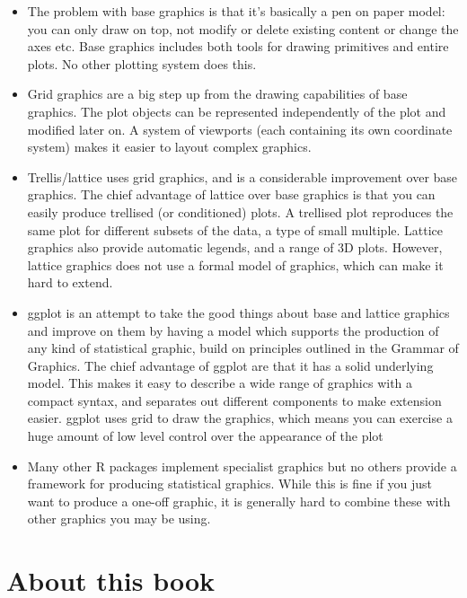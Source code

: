 \begin{itemize} 
	\item The problem with base graphics is that it's basically a pen on paper model: you can only draw on top, not modify or delete existing content or change the axes etc.  Base graphics includes both tools for drawing primitives and entire plots. No other plotting system does this.

	\item Grid graphics are a big step up from the drawing capabilities of base graphics. The plot objects can be represented independently of the plot and modified later on. A system of viewports (each containing its own coordinate system) makes it easier to layout complex graphics.

	\item Trellis/lattice uses grid graphics, and is a considerable improvement over base graphics.  The chief advantage of lattice over base graphics is that you can easily produce trellised (or conditioned) plots.  A trellised plot reproduces the same plot for different subsets of the data, a type of small multiple.  Lattice graphics also provide automatic legends, and a range of 3D plots.  However, lattice graphics does not use a formal model of graphics, which can make it hard to extend.

	\item ggplot is an attempt to take the good things about base and lattice graphics and improve on them by having a model which supports the production of any kind of statistical graphic, build on principles outlined in the Grammar of Graphics.  The chief advantage of ggplot are that it has a solid underlying model.  This makes it easy to describe a wide range of graphics with a compact syntax, and separates out different components to make extension easier.  ggplot uses grid to draw the graphics, which means you can exercise a huge amount of low level control over the appearance of the plot

	\item Many other R packages implement specialist graphics but no others provide a framework for producing statistical graphics. While this is fine if you just want to produce a one-off graphic, it is generally hard to combine these with other graphics you may be using.
\end{itemize}

\section{About this book}\label{sec:about_this_book}

